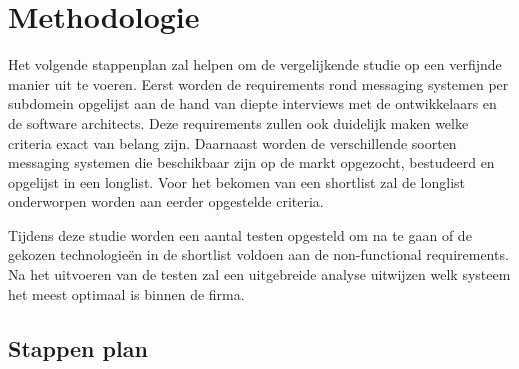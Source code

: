 


\section{Methodologie}%
\label{sec:methodologie}

Het volgende stappenplan zal helpen om de vergelijkende studie op een verfijnde manier uit te voeren.
Eerst worden de requirements rond messaging systemen per subdomein opgelijst aan de hand van diepte interviews 
met de ontwikkelaars en de software architects. 
Deze requirements zullen ook duidelijk maken welke criteria exact van belang zijn.
Daarnaast worden de verschillende soorten messaging systemen die beschikbaar zijn op de markt opgezocht, bestudeerd en opgelijst in een longlist.
Voor het bekomen van een shortlist zal de longlist onderworpen worden aan eerder opgestelde criteria.
\newline

Tijdens deze studie worden een aantal testen opgesteld om na te gaan of de gekozen technologieën in de shortlist voldoen aan de non-functional requirements.
Na het uitvoeren van de testen zal een uitgebreide analyse uitwijzen welk systeem het meest optimaal is binnen de firma.

\subsection{Stappen plan}

